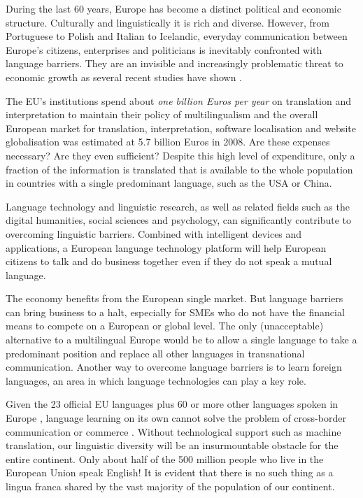 \documentclass[10pt, plain]{../../metanetpaper}
\begin{document}
\begin{multicols}{2}
During the last 60 years, Europe has become a distinct political and economic structure. Culturally and linguistically it is rich and diverse. However, from Portuguese to Polish and Italian to Icelandic, everyday communication between Europe's citizens, enterprises and politicians is inevitably confronted with language barriers. They are an invisible and increasingly problematic threat to economic growth as several recent studies have shown \cite{economist12}.

The EU's institutions spend about \emph{one billion Euros per year} on translation and interpretation to maintain their policy of multilingualism \cite{EC7} and the overall European market for translation, interpretation, software localisation and website globalisation was estimated at 5.7 billion Euros in 2008. Are these expenses necessary? Are they even sufficient? Despite this high level of expenditure, only a fraction of the information is translated that is available to the whole population in countries with a single predominant language, such as the USA or China.

Language technology and linguistic research, as well as related fields such as the digital humanities, social sciences and psychology, can significantly contribute to overcoming linguistic barriers. Combined with intelligent devices and applications, a European language technology platform will help European citizens to talk and do business together even if they do not speak a mutual language.

The economy benefits from the European single market. But language barriers can bring business to a halt, especially for SMEs who do not have the financial means to compete on a European or global level. The only (unacceptable) alternative to a multilingual Europe \cite{lre2011} would be to allow a single language to take a predominant position and replace all other languages in transnational communication. Another way to overcome language barriers is to learn foreign languages, an area in which language technologies can play a key role.

Given the 23 official EU languages plus 60 or more other languages spoken in Europe \cite{eurobarometer2012}, language learning on its own cannot solve the problem of cross-border communication or commerce \cite{economist12}. Without technological support such as machine translation, our linguistic diversity will be an insurmountable obstacle for the entire continent. Only about half of the 500 million people who live in the European Union speak English! It is evident that there is no such thing as a lingua franca shared by the vast majority of the population of our continent.


\end{multicols}
\end{document}
